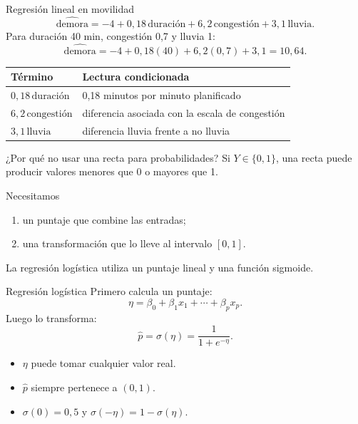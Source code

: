 \documentclass[aspectratio=169,10pt]{beamer}
\begin{document}
\begin{frame}{Regresión lineal en movilidad}
  \footnotesize
  \[\widehat{\text{demora}}=-4+0{,}18\,\text{duración}+6{,}2\,\text{congestión}+3{,}1\,\text{lluvia}.\]
  Para duración 40 min, congestión 0,7 y lluvia 1:
  \[\widehat{\text{demora}}=-4+0{,}18(40)+6{,}2(0{,}7)+3{,}1=10{,}64.\]
  \begin{tabularx}{\textwidth}{>{\bfseries}p{}X}\toprule
  Término & Lectura condicionada\\\midrule
  $0{,}18\,\text{duración}$ & 0,18 minutos por minuto planificado\\
  $6{,}2\,\text{congestión}$ & diferencia asociada con la escala de congestión\\
  $3{,}1\,\text{lluvia}$ & diferencia lluvia frente a no lluvia\\\bottomrule
  \end{tabularx}
\end{frame}

\begin{frame}{¿Por qué no usar una recta para probabilidades?}
  \small
  Si $Y\in\{0,1\}$, una recta puede producir valores menores que 0 o mayores que 1.
  \begin{block}{Necesitamos}
    \begin{enumerate}
      \item un puntaje que combine las entradas;
      \item una transformación que lo lleve al intervalo $[0,1]$.
    \end{enumerate}
  \end{block}
  La regresión logística utiliza un puntaje lineal y una función sigmoide.
\end{frame}

\begin{frame}{Regresión logística}
  \small
  Primero calcula un puntaje:
  \[\eta=\beta_0+\beta_1x_1+\cdots+\beta_px_p.\]
  Luego lo transforma:
  \[\widehat p=\sigma(\eta)=\frac{1}{1+e^{-\eta}}.\]
  \begin{itemize}
    \item $\eta$ puede tomar cualquier valor real.
    \item $\widehat p$ siempre pertenece a $(0,1)$.
    \item $\sigma(0)=0{,}5$ y $\sigma(-\eta)=1-\sigma(\eta)$.
  \end{itemize}
\end{frame}
\end{document}
